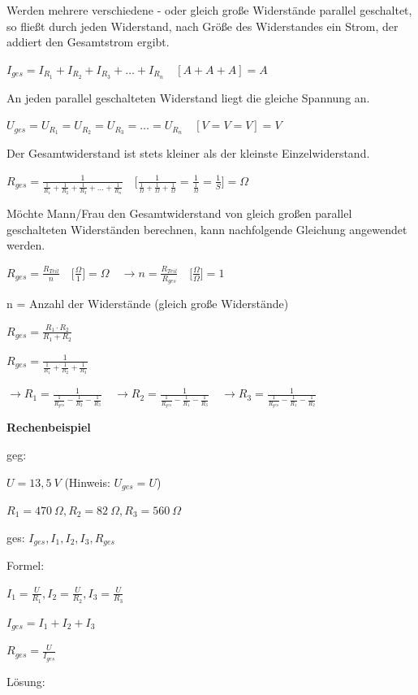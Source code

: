 Werden mehrere verschiedene - oder gleich große Widerstände parallel
geschaltet, so fließt durch jeden Widerstand, nach Größe des
Widerstandes ein Strom, der addiert den Gesamtstrom ergibt.

$I_{ges} = I_{R_1} + I_{R_2} + I_{R_3} + \dots + I_{R_n} \quad [A + A + A] = A$

An jeden parallel geschalteten Widerstand liegt die gleiche Spannung an.

$U_{ges} = U_{R_1} = U_{R_2} = U_{R_3} = \dots = U_{R_n} \quad [V = V = V] = V$

Der Gesamtwiderstand ist stets kleiner als der kleinste
Einzelwiderstand.

$R_{ges} = \frac{1}{\frac{1}{R_1} + \frac{1}{R_2} + \frac{1}{R_3} + \dots + \frac{1}{R_n}} \quad \bigl[\frac{1}{\frac{1}{\Omega} + \frac{1}{\Omega} + \frac{1}{\Omega}} = \frac{1}{\frac{1}{\Omega}} = \frac{1}{S}\bigl] = \Omega$

Möchte Mann/Frau den Gesamtwiderstand von gleich großen parallel
geschalteten Widerständen berechnen, kann nachfolgende Gleichung
angewendet werden.

$R_{ges} = \frac{R_{Teil}}{n} \quad \bigl[\frac{\Omega}{1}\bigl] = \Omega \quad \to n = \frac{R_{Teil}}{R_{ges}} \quad \bigl[\frac{\Omega}{\Omega}\bigl] = 1$

n = Anzahl der Widerstände (gleich große Widerstände)

$R_{ges} = \frac{R_1 \cdot R_2}{R_1 + R_2}$

$R_{ges} = \frac{1}{\frac{1}{R_1} + \frac{1}{R_2} + \frac{1}{R_3}}$

$\to R_{1} = \frac{1}{\frac{1}{R_{ges}} - \frac{1}{R_2} - \frac{1}{R_3}} \quad \to R_{2} = \frac{1}{\frac{1}{R_{ges}} - \frac{1}{R_1} - \frac{1}{R_3}} \quad \to R_{3} = \frac{1}{\frac{1}{R_{ges}} - \frac{1}{R_1} - \frac{1}{R_2}}$

\textbf{Rechenbeispiel}

geg: \textbar\textbar{}

$U = 13,5~V$ (Hinweis: $U_{ges} = U$)

$R_1 = 470~\Omega, R_2 = 82~\Omega, R_3 = 560~\Omega$

ges: $I_{ges}, I_1, I_2, I_3, R_{ges}$

Formel:

$I_1 = \frac{U}{R_1}, I_2 = \frac{U}{R_2}, I_3 = \frac{U}{R_3}$

$I_{ges} = I_1 + I_2 + I_3$

$R_{ges} = \frac{U}{I_{ges}}$

Lösung:

